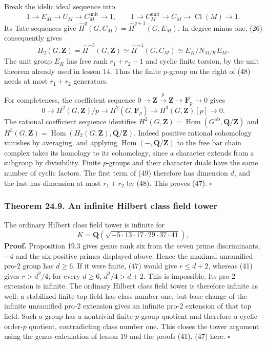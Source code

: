 \documentclass[11pt,a4paper]{article}
\begin{document}
Break the idelic ideal sequence into \[
1\to E_M\to U_M\to C_M^{\mathrm{unit}}\to1,
\qquad
1\to C_M^{\mathrm{unit}}\to C_M\to\operatorname{Cl}(M)\to1.
\] Its Tate sequences give
\(\widehat H^q(G,C_M)=\widehat H^{q+1}(G,E_M)\). In degree minus one,
(26) consequently gives \[
H_2(G,\mathbf Z)
=\widehat H^{-3}(G,\mathbf Z)
\simeq\widehat H^{-1}(G,C_M)
\simeq E_K/N_{M/K}E_M.
\tag{48}
\] The unit group \(E_K\) has free rank \(r_1+r_2-1\) and cyclic finite
torsion, by the unit theorem already used in lesson 14. Thus the finite
\(p\)-group on the right of (48) needs at most \(r_1+r_2\) generators.

For completeness, the coefficient sequence
\(0\to\mathbf Z\xrightarrow{p}\mathbf Z\to\mathbf F_p\to0\) gives \[
0\to H^2(G,\mathbf Z)/p\to H^2(G,\mathbf F_p)
\to H^3(G,\mathbf Z)[p]\to0.
\tag{49}
\] The rational coefficient sequence identifies
\(H^2(G,\mathbf Z)=\operatorname{Hom}(G^{\mathrm{ab}},\mathbf Q/\mathbf Z)\)
and
\(H^3(G,\mathbf Z)=\operatorname{Hom}(H_2(G,\mathbf Z),\mathbf Q/\mathbf Z)\).
Indeed positive rational cohomology vanishes by averaging, and applying
\(\operatorname{Hom}(-,\mathbf Q/\mathbf Z)\) to the free bar chain
complex takes its homology to its cohomology, since a character extends
from a subgroup by divisibility. Finite \(p\)-groups and their character
duals have the same number of cyclic factors. The first term of (49)
therefore has dimension \(d\), and the last has dimension at most
\(r_1+r_2\) by (48). This proves (47). \(\square\)

\subsubsection{Theorem 24.9. An infinite Hilbert class field
tower}\label{theorem-24.9.-an-infinite-hilbert-class-field-tower}

The ordinary Hilbert class field tower is infinite for \[
K=\mathbf Q\!\left(\sqrt{-5\cdot13\cdot17\cdot29\cdot37\cdot41}\right),
\] \textbf{Proof.} Proposition 19.3 gives genus rank six from the seven
prime discriminants, \(-4\) and the six positive primes displayed above.
Hence the maximal unramified pro-2 group has \(d\geq6\). If it were
finite, (47) would give \(r\leq d+2\), whereas (41) gives \(r>d^2/4\);
for every \(d\geq6\), \(d^2/4>d+2\). This is impossible. Its pro-2
extension is infinite. The ordinary Hilbert class field tower is
therefore infinite as well: a stabilized finite top field has class
number one, but base change of the infinite unramified pro-2 extension
gives an infinite pro-2 extension of that top field. Such a group has a
nontrivial finite \(p\)-group quotient and therefore a cyclic
order-\(p\) quotient, contradicting class number one. This closes the
tower argument using the genus calculation of lesson 19 and the proofs
(41), (47) here. \(\square\)
\end{document}
